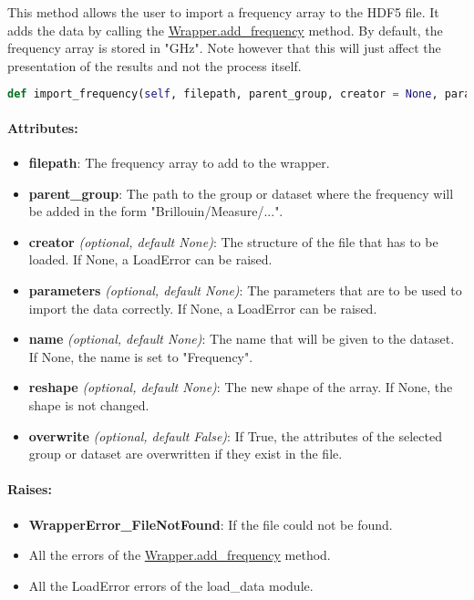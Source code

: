 This method allows the user to import a frequency array to the HDF5 file. It adds the data by calling the \hyperref[subchapter:wrapper.add_frequency]{Wrapper.add\_frequency} method.
By default, the frequency array is stored in "GHz". Note however that this will just affect the presentation of the results and not the process itself.

\begin{lstlisting}[language=Python]
def import_frequency(self, filepath, parent_group, creator = None, parameters = None, name = None, reshape = None, overwrite = False):
\end{lstlisting}

\paragraph{Attributes:}

\begin{itemize}
    \item \textbf{filepath}: The frequency array to add to the wrapper. 
    \item \textbf{parent\_group}: The path to the group or dataset where the frequency will be added in the form "Brillouin/Measure/...".
    \item \textbf{creator} \textit{(optional, default None)}: The structure of the file that has to be loaded. If None, a LoadError can be raised.
    \item \textbf{parameters} \textit{(optional, default None)}: The parameters that are to be used to import the data correctly.  If None, a LoadError can be raised.
    \item \textbf{name} \textit{(optional, default None)}: The name that will be given to the dataset. If None, the name is set to "Frequency".
    \item \textbf{reshape} \textit{(optional, default None)}: The new shape of the array. If None, the shape is not changed.
    \item \textbf{overwrite} \textit{(optional, default False)}: If True, the attributes of the selected group or dataset are overwritten if they exist in the file.
\end{itemize}

\paragraph{Raises:}
\begin{itemize}
    \item \textbf{WrapperError\_FileNotFound}: If the file could not be found.
    \item All the errors of the \hyperref[subchapter:wrapper.add_frequency]{Wrapper.add\_frequency} method.
    \item All the LoadError errors of the load\_data module.
\end{itemize}

